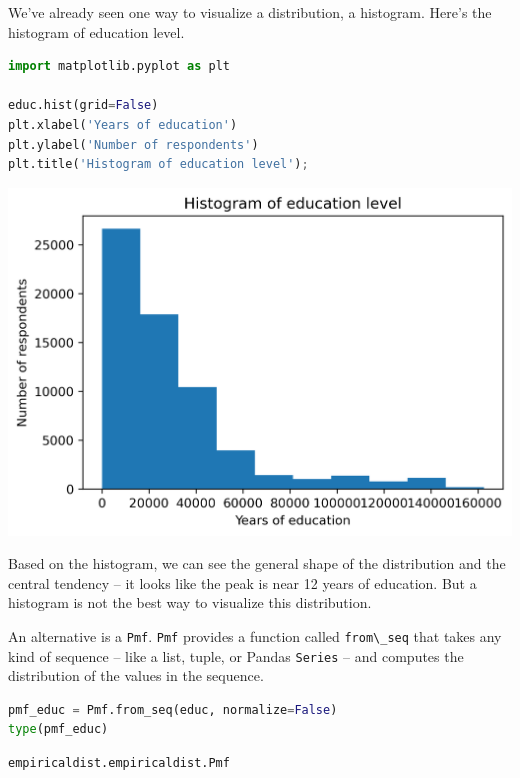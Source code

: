 We've already seen one way to visualize a distribution, a histogram.
Here's the histogram of education level.

\begin{lstlisting}[language=Python,style=source]
import matplotlib.pyplot as plt

educ.hist(grid=False)
plt.xlabel('Years of education')
plt.ylabel('Number of respondents')
plt.title('Histogram of education level');
\end{lstlisting}

\begin{center}
\includegraphics[scale=0.75]{08_distributions_files/08_distributions_36_0.png}
\end{center}

Based on the histogram, we can see the general shape of the distribution
and the central tendency -- it looks like the peak is near 12 years of
education. But a histogram is not the best way to visualize this
distribution.

An alternative is a \passthrough{\lstinline!Pmf!}.
\passthrough{\lstinline!Pmf!} provides a function called
\passthrough{\lstinline!from\_seq!} that takes any kind of sequence --
like a list, tuple, or Pandas \passthrough{\lstinline!Series!} -- and
computes the distribution of the values in the sequence.

\begin{lstlisting}[language=Python,style=source]
pmf_educ = Pmf.from_seq(educ, normalize=False)
type(pmf_educ)
\end{lstlisting}

\begin{lstlisting}[style=output]
empiricaldist.empiricaldist.Pmf
\end{lstlisting}

